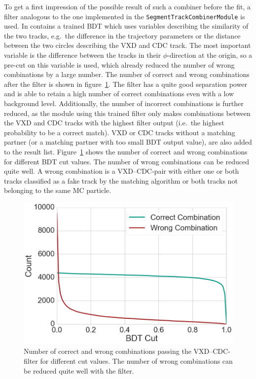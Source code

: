 To get a first impression of the possible result of such a combiner before the fit, a filter analogous to the one implemented in the \texttt{SegmentTrackCombinerModule} is used. In contains a trained BDT which uses variables describing the similarity of the two tracks, e.g.\ the difference in the trajectory parameters or the distance between the two circles describing the VXD and CDC track. The most important variable is the difference between the tracks in their $\phi$-direction at the origin, so a pre-cut on this variable is used, which already reduced the number of wrong combinations by a large number. The number of correct and wrong combinations after the filter is shown in figure~\ref{fig-vxd-cdc-count}. The filter has a quite good separation power and is able to retain a high number of correct combinations even with a low background level. Additionally, the number of incorrect combinations is further reduced, as the module using this trained filter only makes combinations between the VXD and CDC tracks with the highest filter output (i.e.\ the highest probability to be a correct match). VXD or CDC tracks without a matching partner (or a matching partner with too small BDT output value), are also added to the result list. Figure~\ref{fig-vxd-cdc-count} shows the number of correct and wrong combinations for different BDT cut values. The number of wrong combinations can be reduced quite well. A wrong combination is a VXD--CDC-pair with either one or both tracks classified as a fake track by the matching algorithm or both tracks not belonging to the same MC particle.

\begin{figure}
  \centering
  \includegraphics[width=0.7\linewidth]{figures/workflow/vxd_cdc_merger_count.png}
  \caption{Number of correct and wrong combinations passing the VXD--CDC-filter for different cut values. The number of wrong combinations can be reduced quite well with the filter.}
  \label{fig-vxd-cdc-count}
\end{figure}

